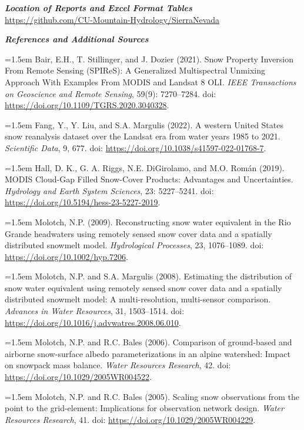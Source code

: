 \documentclass{article}
\begin{document}
\noindent\textbf{\textit{Location of Reports and Excel Format Tables}}\\
\href{https://github.com/CU-Mountain-Hydrology/SierraNevada}{\underline{https://github.com/CU-Mountain-Hydrology/SierraNevada}}

\newpage
\fontsize{12}{16}
\noindent\textbf{\textit{References and Additional Sources}}\\
\fontsize{10}{14}

\noindent
\hangindent=1.5em
Bair, E.H., T. Stillinger, and J. Dozier (2021). Snow Property Inversion From Remote Sensing (SPIReS): A Generalized Multispectral Unmixing Approach With Examples From MODIS and Landsat 8 OLI. \textit{IEEE Transactions on Geoscience and Remote Sensing}, 59(9): 7270–7284. doi: \url{https://doi.org/10.1109/TGRS.2020.3040328}.

\noindent
\hangindent=1.5em
Fang, Y., Y. Liu, and S.A. Margulis (2022). A western United States snow reanalysis dataset over the Landsat era from water years 1985 to 2021. \textit{Scientific Data}, 9, 677. doi: \url{https://doi.org/10.1038/s41597-022-01768-7}.

\noindent
\hangindent=1.5em
Hall, D. K., G. A. Riggs, N.E. DiGirolamo, and M.O. Román (2019). MODIS Cloud-Gap Filled Snow-Cover Products: Advantages and Uncertainties. \textit{Hydrology and Earth System Sciences}, 23: 5227–5241. doi: \url{https://doi.org/10.5194/hess-23-5227-2019}.

\noindent
\hangindent=1.5em
Molotch, N.P. (2009). Reconstructing snow water equivalent in the Rio Grande headwaters using remotely sensed snow cover data and a spatially distributed snowmelt model. \textit{Hydrological Processes}, 23, 1076–1089. doi: \url{https://doi.org/10.1002/hyp.7206}.

\noindent
\hangindent=1.5em
Molotch, N.P. and S.A. Margulis (2008). Estimating the distribution of snow water equivalent using remotely sensed snow cover data and a spatially distributed snowmelt model: A multi-resolution, multi-sensor comparison. \textit{Advances in Water Resources}, 31, 1503–1514. doi: \url{https://doi.org/10.1016/j.advwatres.2008.06.010}.

\noindent
\hangindent=1.5em
Molotch, N.P. and R.C. Bales (2006). Comparison of ground-based and airborne snow-surface albedo parameterizations in an alpine watershed: Impact on snowpack mass balance. \textit{Water Resources Research}, 42. doi: \url{https://doi.org/10.1029/2005WR004522}.

\noindent
\hangindent=1.5em
Molotch, N.P. and R.C. Bales (2005). Scaling snow observations from the point to the grid-element: Implications for observation network design. \textit{Water Resources Research}, 41. doi: \url{https://doi.org/10.1029/2005WR004229}.
\end{document}
